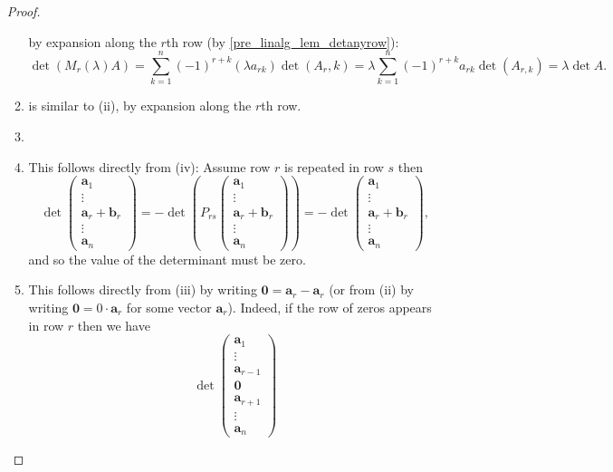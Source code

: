 \documentclass[10pt, a4paper]{article}
\newcommand{\mbf}[1]{\mathbf{#1}}
\begin{document}
\begin{enumerate}[label = (\roman*)]
\begin{proof}
\begin{enumerate}[label = (\roman*)]
            by expansion along the $r$th row (by \autoref{pre_linalg_lem_detanyrow}):
            \[
            \det(M_r(\lambda)A) = \sum_{k = 1}^{n}(-1) ^ {r + k}(\lambda a_{rk})\det(A_r, k) = \lambda\sum_{k = 1}^{n}(-1) ^ {r + k}a_{rk}\det(A_{r, k}) = \lambda\det A.
            \]
            \item is similar to (ii),
            by expansion along the $r$th row.
            \item \phantom{}
            \item This follows directly from (iv):
            Assume row $r$ is repeated in row $s$ then
            \[
            \det\begin{pmatrix}
                \mbf{a}_1 \\ \vdots \\ \mbf{a}_r + \mbf{b}_r \\ \vdots \\ \mbf{a}_n
            \end{pmatrix}
            =
            -\det\left(P_{rs}\begin{pmatrix}
                \mbf{a}_1 \\ \vdots \\ \mbf{a}_r + \mbf{b}_r \\ \vdots \\ \mbf{a}_n
            \end{pmatrix}\right)
            =
            -\det\begin{pmatrix}
                \mbf{a}_1 \\ \vdots \\ \mbf{a}_r + \mbf{b}_r \\ \vdots \\ \mbf{a}_n
            \end{pmatrix},
            \]
            and so the value of the determinant must be zero.
            \item This follows directly from (iii) by writing $\mbf{0} = \mbf{a}_r - \mbf{a}_r$ (or from (ii) by writing $\mbf{0} = 0 \cdot \mbf{a}_r$ for some vector $\mbf{a}_r$).
            Indeed,
            if the row of zeros appears in row $r$ then we have
            \[
            \det\begin{pmatrix}
                \mbf{a}_1 \\ \vdots \\ \mbf{a}_{r - 1} \\ \mbf{0} \\ \mbf{a}_{r + 1} \\ \vdots \\ \mbf{a}_n

\end{pmatrix}\]
\end{enumerate}
\end{proof}
\end{enumerate}
\end{document}
